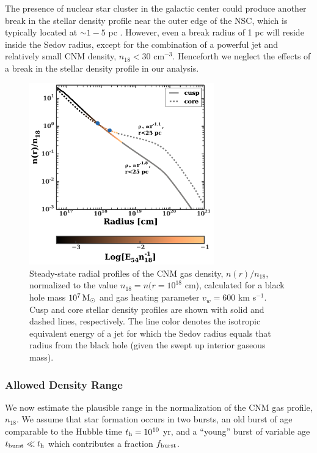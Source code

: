 \documentclass[usenatbib,fleqn]{mnras}
\newcommand{\Msun}{{\rm M_\odot}}
\begin{document}
The presence of nuclear star
cluster in the galactic center could produce another break in the
stellar density profile near the outer edge of the NSC, which is
typically located at $\sim 1-5$ pc \citep{Georgiev+2014}.  However,
even a break radius of 1 pc will reside inside the Sedov radius,
except for the combination of a powerful jet and relatively small CNM
density, $n_{18}<30$ cm$^{-3}$.  Henceforth we neglect the effects of
a break in the stellar density profile in our analysis.


\begin{figure}
\includegraphics[width=8cm]{sedov_radius.pdf}
\caption{\label{fig:profiles} Steady-state radial profiles of the CNM
  gas density, $n(r)/n_{18}$, normalized to the value $n_{18} = n(r =
  10^{18}$ cm), calculated for a black hole mass $10^{7} \,\Msun$ and
  gas heating parameter $v_w=600$ km s$^{-1}$.  Cusp and core stellar
  density profiles are shown with solid and dashed lines,
  respectively.  The line color denotes the isotropic equivalent
  energy of a jet for which the Sedov radius equals that radius from
  the black hole (given the swept up interior gaseous mass).}
\end{figure}



\subsubsection{Allowed Density Range}
\label{sec:densAllowed}

We now estimate the plausible range in the normalization of the CNM gas profile, $n_{18}$.  We assume that star formation
occurs in two bursts, an old burst of age comparable to the Hubble
time $t_{\rm h} = 10^{10}$ yr, and a ``young'' burst of variable age
$t_{\rm burst} \ll t_{\rm h}$ which contributes a fraction $f_{\rm
  burst}$.
\end{document}
